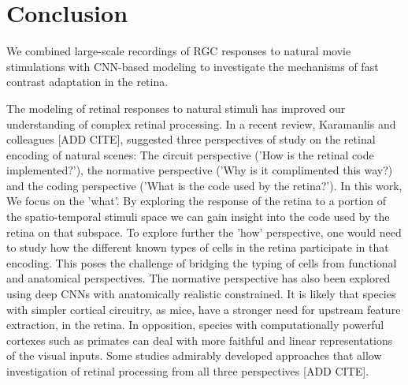 \section{Conclusion}\label{sec:Conclusion}

We combined large-scale recordings of RGC responses to natural movie
stimulations with CNN-based modeling to investigate the mechanisms of fast
contrast adaptation in the retina.

The modeling of retinal responses to natural stimuli has improved our
understanding of complex retinal processing. In a recent review, Karamanlis and
colleagues [ADD CITE], suggested three perspectives of study on the retinal
encoding of natural scenes: The circuit perspective ('How is the retinal code
implemented?'), the normative perspective ('Why is it complimented this way?)
and the coding perspective ('What is the code used by the retina?'). In this
work,
We focus on the 'what'. By exploring the response of the retina to a portion of
the spatio-temporal stimuli space we can gain insight into the code used by the
retina on that subspace. To explore further the 'how' perspective, one would
need to study how the different known types of cells in the retina participate
in that encoding. This poses the challenge of bridging the typing of cells from
functional and anatomical perspectives.
The normative perspective has also been explored using deep CNNs with
anatomically realistic constrained. It is likely that species with simpler
cortical circuitry, as mice, have a stronger need for upstream feature
extraction, in the retina. In opposition, species with computationally powerful
cortexes such as primates can deal with more faithful and linear
representations
of the visual inputs.
Some studies admirably developed approaches that allow investigation of retinal
processing from all three perspectives [ADD CITE].